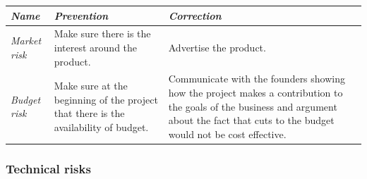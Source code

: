 \begin{landscape}
\begin{tabular}{>{\raggedright}p{4cm}|>{\raggedright}p{10cm}|>{\raggedright}p{8cm}}
\hline 
\emph{Name} & \emph{Prevention} & \emph{Correction}\tabularnewline
\hline 
\hline 
\emph{Market risk} & {\small{}Make sure there is the interest around the product.} & {\small{}Advertise the product.}\tabularnewline
\hline 
\emph{Budget risk} & {\small{}Make sure at the beginning of the project that there is the
availability of budget.} & {\small{}Communicate with the founders showing how the project makes
a contribution to the goals of the business and argument about the
fact that cuts to the budget would not be cost effective.}\tabularnewline
\hline 
\end{tabular}

\newpage{}


\subsubsection{Technical risks}

\medskip{}



\end{landscape}

